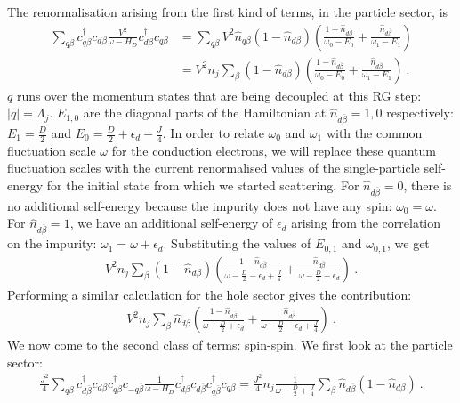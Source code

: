 \documentclass{iopart}
\begin{document}
The renormalisation arising from the first kind of terms, in the particle sector, is
\begin{eqnarray}
	\sum_{q\beta}c^\dagger_{q\beta}c_{d\beta}\frac{V^2}{\omega - H_D}c^\dagger_{d\beta}c_{q\beta} &= \sum_{q\beta}V^2 \hat n_{q\beta} \left( 1 - \hat n_{d\beta} \right)\left( \frac{1-\hat n_{d \overline\beta }}{\omega_0 - E_0} + \frac{\hat n_{d \overline\beta}}{\omega_1 - E_1}\right) \nonumber\\
												      &= V^2 n_j\sum_{\beta}\left( 1 - \hat n_{d\beta} \right)\left( \frac{1-\hat n_{d \overline\beta }}{\omega_0 - E_0} + \frac{\hat n_{d \overline\beta}}{\omega_1 - E_1}\right)~.
\end{eqnarray}
\(q\) runs over the momentum states that are being decoupled at this RG step: \(|q| = \Lambda_j\). \(E_{1,0}\) are the diagonal parts of the Hamiltonian at \(\hat n_{d\overline \beta}=1,0\) respectively: \(E_1 = \frac{D}{2}\) and \(E_0 = \frac{D}{2} + \epsilon_d - \frac{J}{4}\). In order to relate \(\omega_0\) and \(\omega_1\) with the common fluctuation scale \(\omega\) for the conduction electrons, we will replace these quantum fluctuation scales with the current renormalised values of the single-particle self-energy for the initial state from which we started scattering. For \(\hat n_{d\overline\beta}=0\), there is no additional self-energy because the impurity does not have any spin: \(\omega_0 = \omega\). For \(\hat n_{d\overline\beta} = 1\), we have an additional self-energy of \(\epsilon_d\) arising from the correlation on the impurity: \(\omega_1 = \omega + \epsilon_d\).
Substituting the values of \(E_{0,1}\) and \(\omega_{0,1}\), we get
\begin{eqnarray}
	\label{ren_ed_Vp}
	V^2 n_j\sum_{\beta}\left( 1 - \hat n_{d\beta} \right)\left( \frac{1-\hat n_{d \overline\beta }}{\omega - \frac{D}{2} - \epsilon_d + \frac{J}{4}} + \frac{\hat n_{d \overline\beta}}{\omega - \frac{D}{2} + \epsilon_d}\right)~.
\end{eqnarray}
Performing a similar calculation for the hole sector gives the contribution:
\begin{eqnarray}
	\label{ren_ed_Vh}
	V^2 n_j\sum_{\beta}\hat n_{d\beta}\left( \frac{1-\hat n_{d \overline\beta }}{\omega - \frac{D}{2} + \epsilon_d} + \frac{\hat n_{d \overline\beta}}{\omega - \frac{D}{2} - \epsilon_d + \frac{J}{4}}\right)~.
\end{eqnarray}
We now come to the second class of terms: spin-spin. We first look at the particle sector:
\begin{eqnarray}
	\label{ren_ed_Jpp}
	\frac{J^2}{4}\sum_{q\beta}c^\dagger_{d\overline\beta}c_{d\beta}c^\dagger_{q\beta}c_{-q\overline\beta} \frac{1}{\omega - H_D}c^\dagger_{d\beta}c_{d\overline\beta}c^\dagger_{q\overline\beta}c_{q\beta} = \frac{J^2}{4} n_j\frac{1}{\omega - \frac{D}{2} + \frac{J}{4}} \sum_{\beta}\hat n_{d\overline\beta}\left( 1 - \hat n_{d\beta} \right)~.
\end{eqnarray}
\end{document}
